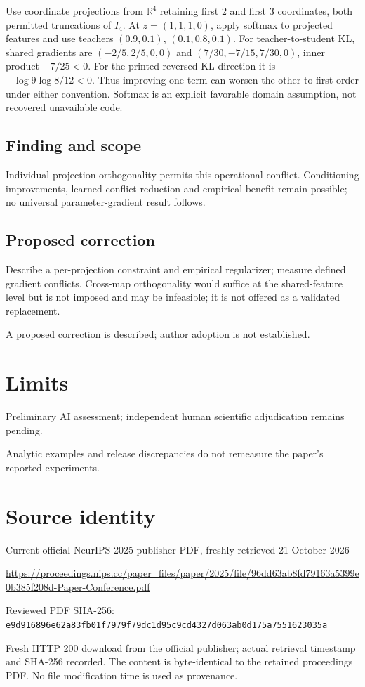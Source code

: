 \documentclass[11pt]{article}
\begin{document}
Use coordinate projections from \(\mathbb R^4\) retaining first \(2\) and first \(3\) coordinates, both permitted truncations of \(I_4\). At \(z=(1,1,1,0)\), apply softmax to projected features and use teachers \((0.9,0.1)\), \((0.1,0.8,0.1)\). For teacher-to-student KL, shared gradients are \((-2/5,2/5,0,0)\) and \((7/30,-7/15,7/30,0)\), inner product \(-7/25<0\). For the printed reversed KL direction it is \(-\log9\log8/12<0\). Thus improving one term can worsen the other to first order under either convention. Softmax is an explicit favorable domain assumption, not recovered unavailable code.

\subsection*{Finding and scope}

Individual projection orthogonality permits this operational conflict. Conditioning improvements, learned conflict reduction and empirical benefit remain possible; no universal parameter-gradient result follows.

\subsection*{Proposed correction}

Describe a per-projection constraint and empirical regularizer; measure defined gradient conflicts. Cross-map orthogonality would suffice at the shared-feature level but is not imposed and may be infeasible; it is not offered as a validated replacement.

A proposed correction is described; author adoption is not established.

\section*{Limits}

Preliminary AI assessment; independent human scientific adjudication remains pending.\par

Analytic examples and release discrepancies do not remeasure the paper’s reported experiments.\par

\section*{Source identity}

Current official NeurIPS 2025 publisher PDF, freshly retrieved 21 October 2026

\url{https://proceedings.nips.cc/paper_files/paper/2025/file/96dd63ab8fd79163a5399e0b385f208d-Paper-Conference.pdf}

Reviewed PDF SHA-256: \nolinkurl{e9d916896e62a83fb01f7979f79dc1d95c9cd4327d063ab0d175a7551623035a}

Fresh HTTP 200 download from the official publisher; actual retrieval timestamp and SHA-256 recorded. The content is byte-identical to the retained proceedings PDF. No file modification time is used as provenance.
\end{document}
